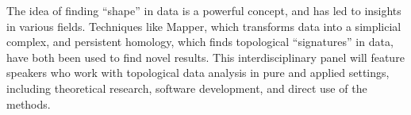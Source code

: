 The idea of finding ``shape'' in data is a powerful concept, and has led to insights in various fields. Techniques like Mapper, which transforms data into a simplicial complex, and persistent homology, which finds topological ``signatures'' in data, have both been used to find novel results. This interdisciplinary panel will feature speakers who work with topological data analysis in pure and applied settings, including theoretical research, software development, and direct use of the methods.